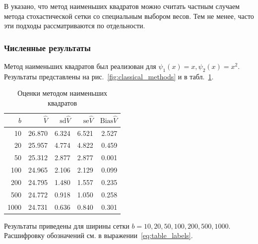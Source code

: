 \documentclass[specialist,
               substylefile = ../spbu.rtx,
               subf,href,colorlinks=true, 12pt]{disser}
\newcommand{\Vhat}{\hat{V}}
\begin{document}
В \cite{Glasserman2004} указано, что метод наименьших квадратов можно считать частным случаем метода стохастической сетки со специальным выбором весов. Тем не менее, часто эти подходы рассматриваются по отдельности.

\subsubsection{Численные результаты} %
\label{ssub:lsm_numerical_results}

Метод наименьших квадратов был реализован для $\psi_1(x) = x, \psi_2(x) = x^2$. Результаты представлены на рис.~\ref{fig:classical_methods} и в табл.~\ref{tbl:lsm_estimators}.

\begin{table}
	\centering
	\caption{Оценки методом наименьших квадратов}
	\begin{tabular}{rrrrr}
		$b$&$\Vhat$&$\mathrm{sd}\Vhat$&$\mathrm{se}\Vhat$&$\mathrm{Bias}\Vhat$\\\hline
		10&26.870&6.324&6.521&2.527\\
		20&25.957&4.774&4.822&0.459\\
		50&25.312&2.877&2.877&0.001\\
		100&24.965&2.106&2.129&0.099\\
		200&24.795&1.480&1.557&0.235\\
		500&24.772&0.918&1.050&0.258\\
		1000&24.731&0.636&0.840&0.301\\
	\end{tabular}
	\label{tbl:lsm_estimators}

	\footnotesize
	Результаты приведены для ширины сетки $b = 10, 20, 50, 100, 200, 500, 1000$.\\\vspace{-0.3\baselineskip}Расшифровку обозначений см. в выражении~\eqref{eq:table_labels}.
\end{table}








\end{document}
